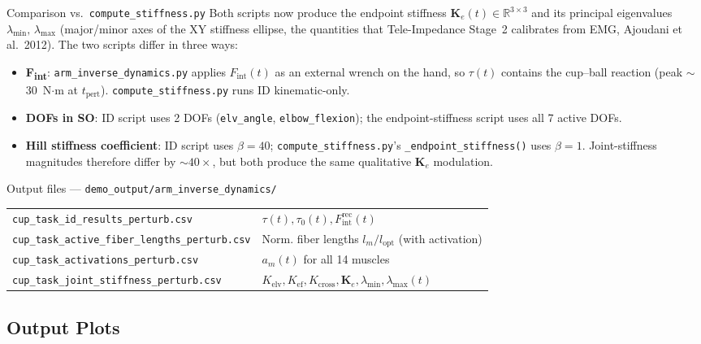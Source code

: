 \documentclass[11pt,a4paper]{article}
\newcommand{\py}[1]{\texttt{\color{PipeBlue}#1}}
\newcommand{\file}[1]{\texttt{\color{PipePurple}#1}}
\newcommand{\outdir}[1]{\texttt{\small\color{PipeGreen}#1}}
\newcommand{\dof}[1]{\texttt{\small #1}}
\newcommand{\R}{\mathbb{R}}
\begin{document}
\begin{notebox}[PipeOrange]{Comparison vs.\ \file{compute\_stiffness.py}}
Both scripts now produce the endpoint stiffness $\bm{K}_e(t) \in \R^{3\times3}$
and its principal eigenvalues $\lambda_\text{min},\,\lambda_\text{max}$
(major/minor axes of the XY stiffness ellipse, the quantities that
Tele-Impedance Stage~2 calibrates from EMG, Ajoudani et al.\ 2012).
The two scripts differ in three ways:
\begin{itemize}\itemsep2pt
  \item \textbf{F\textsubscript{int}}: \file{arm\_inverse\_dynamics.py} applies
    $F_\text{int}(t)$ as an external wrench on the hand, so $\tau(t)$
    contains the cup--ball reaction (peak $\sim$30~N$\cdot$m at
    $t_\text{pert}$). \file{compute\_stiffness.py} runs ID kinematic-only.
  \item \textbf{DOFs in SO}: ID script uses 2 DOFs
    (\dof{elv\_angle}, \dof{elbow\_flexion}); the endpoint-stiffness script
    uses all 7 active DOFs.
  \item \textbf{Hill stiffness coefficient}: ID script uses $\beta=40$;
    \file{compute\_stiffness.py}'s \texttt{\_endpoint\_stiffness()} uses
    $\beta=1$. Joint-stiffness magnitudes therefore differ by $\sim40\times$,
    but both produce the same qualitative $\bm{K}_e$ modulation.
\end{itemize}
\end{notebox}

\begin{notebox}[PipePurple]{Output files — \outdir{demo\_output/arm\_inverse\_dynamics/}}
\begin{tabular}{ll}
\py{cup\_task\_id\_results\_perturb.csv}          & $\tau(t), \tau_0(t), F^\text{rec}_\text{int}(t)$ \\
\py{cup\_task\_active\_fiber\_lengths\_perturb.csv} & Norm. fiber lengths $l_m/l_\text{opt}$ (with activation) \\
\py{cup\_task\_activations\_perturb.csv}           & $a_m(t)$ for all 14 muscles \\
\py{cup\_task\_joint\_stiffness\_perturb.csv}      & $K_\text{elv}, K_\text{ef}, K_\text{cross}, \bm{K}_e, \lambda_\text{min}, \lambda_\text{max}(t)$ \\
\end{tabular}
\end{notebox}

\subsection{Output Plots}
\end{document}
